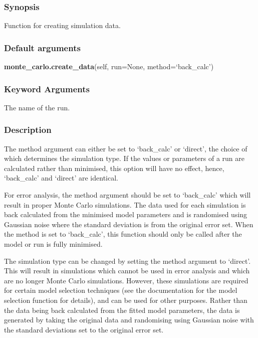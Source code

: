 \subsubsection{Synopsis}

Function for creating simulation data.

\subsubsection{Default arguments}

\textsf{\textbf{monte\_carlo.create\_data}(self, run=None, method=`back\_calc')}


\subsubsection{Keyword Arguments}

  The name of the run.


\subsubsection{Description}

The method argument can either be set to `back\_calc' or `direct', the choice of which
determines the simulation type.  If the values or parameters of a run are calculated rather
than minimised, this option will have no effect, hence, `back\_calc' and `direct' are
identical.

For error analysis, the method argument should be set to `back\_calc' which will result in
proper Monte Carlo simulations.  The data used for each simulation is back calculated from
the minimised model parameters and is randomised using Gaussian noise where the standard
deviation is from the original error set.  When the method is set to `back\_calc', this
function should only be called after the model or run is fully minimised.

The simulation type can be changed by setting the method argument to `direct'.  This will
result in simulations which cannot be used in error analysis and which are no longer Monte
Carlo simulations.  However, these simulations are required for certain model selection
techniques (see the documentation for the model selection function for details), and can be
used for other purposes.  Rather than the data being back calculated from the fitted model
parameters, the data is generated by taking the original data and randomising using Gaussian
noise with the standard deviations set to the original error set.



